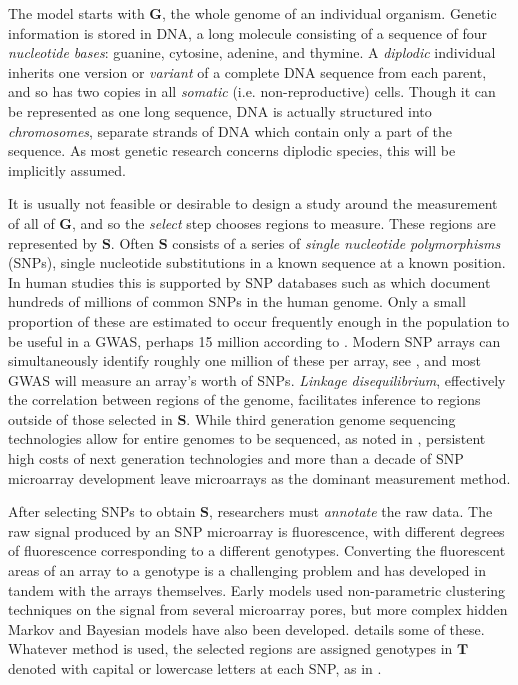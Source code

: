 \documentclass{article}
\newcommand{\m}[1]{\mathbf{#1}}               %
\begin{document}
The model starts with $\m{G}$, the whole genome of an individual organism. Genetic information is stored in DNA, a long molecule consisting of a sequence of four \emph{nucleotide bases}: guanine, cytosine, adenine, and thymine. A \emph{diplodic} individual inherits one version or \emph{variant} of a complete DNA sequence from each parent, and so has two copies in all \emph{somatic} (i.e. non-reproductive) cells. Though it can be represented as one long sequence, DNA is actually structured into \emph{chromosomes}, separate strands of DNA which contain only a part of the sequence. As most genetic research concerns diplodic species, this will be implicitly assumed.

It is usually not feasible or desirable to design a study around the measurement of all of $\m{G}$, and so the \emph{select} step chooses regions to measure. These regions are represented by $\m{S}$. Often $\m{S}$ consists of a series of \emph{single nucleotide polymorphisms} (SNPs), single nucleotide substitutions in a known sequence at a known position. In human studies this is supported by SNP databases such as \cite{NCBIdbSNP} which document hundreds of millions of common SNPs in the human genome. Only a small proportion of these are estimated to occur frequently enough in the population to be useful in a GWAS, perhaps 15 million according to \cite{koboldtetal2013next}. Modern SNP arrays can simultaneously identify roughly one million of these per array, see \cite{laframboise2009, tametal2019benefits}, and most GWAS will measure an array's worth of SNPs. \emph{Linkage disequilibrium}, effectively the correlation between regions of the genome, facilitates inference to regions outside of those selected in $\m{S}$. While third generation genome sequencing technologies allow for entire genomes to be sequenced, as noted in \cite{heatherchain2016sequencers, hasinetal2017multi, uffelmannetal2021gwas}, persistent high costs of next generation technologies and more than a decade of SNP microarray development leave microarrays as the dominant measurement method.

After selecting SNPs to obtain $\m{S}$, researchers must \emph{annotate} the raw data. The raw signal produced by an SNP microarray is fluorescence, with different degrees of fluorescence corresponding to a different genotypes. Converting the fluorescent areas of an array to a genotype is a challenging problem and has developed in tandem with the arrays themselves. Early models used non-parametric clustering techniques on the signal from several microarray pores, but more complex hidden Markov and Bayesian models have also been developed. \cite{laframboise2009} details some of these. Whatever method is used, the selected regions are assigned genotypes in $\m{T}$ denoted with capital or lowercase letters at each SNP, as in \cite{siegmundyakir2007, visschergoddard2019}.
\end{document}
